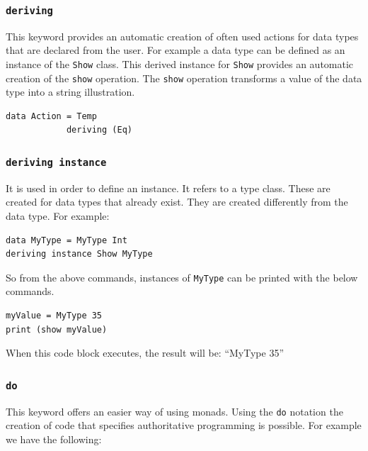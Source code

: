 \documentclass[a4paper, titlepage, twoside]{article}
\begin{document}
\subsubsection{\texttt{deriving}}
\label{sec:org691b52a}

This keyword provides an automatic creation of often used actions for data types that are declared from the user. For example a data type can be defined as an instance of the \texttt{Show} class. This derived instance for \texttt{Show} provides an automatic creation of the \texttt{show} operation. The \texttt{show} operation transforms a value of the data type into a string illustration.

\begin{verbatim}
data Action = Temp
            deriving (Eq)
\end{verbatim}

\subsubsection{\texttt{deriving instance}}
\label{sec:orga6287ac}

It is used in order to define an instance. It refers to a type class. These are created for data types that already exist. They are created differently from the data type. For example:

\begin{verbatim}
data MyType = MyType Int
deriving instance Show MyType
\end{verbatim}

So from the above commands, instances of \texttt{MyType} can be printed with the below commands.

\begin{listing}[H]
\begin{verbatim}
myValue = MyType 35
print (show myValue)
\end{verbatim}
\caption{When this code block executes, the result will be: ``MyType 35''}
\end{listing}

\subsubsection{\texttt{do}}
\label{sec:orgaa50176}

This keyword offers an easier way of using monads. Using the \texttt{do} notation the creation of code that specifies authoritative programming is possible. For example we have the following:
\end{document}
